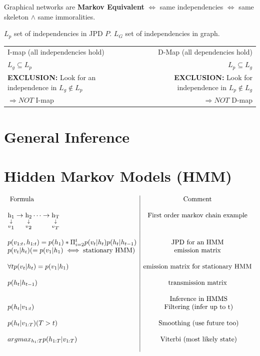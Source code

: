 \documentclass[a4paper,10pt]{article}
\newcommand{\ra}{\rightarrow}
\newcommand{\alow}[2]{\operatorname*{#1}\limits_{\operatorname*{\downarrow}\limits_{\scaleto{#2}{5pt}}}}
\begin{document}
Graphical networks are \textbf{Markov Equivalent} $\iff$ same independencies $\iff$ same skeleton $\wedge$ same immoralities.

$L_p$ set of independencies in JPD $P$.
$L_G$ set of independencies in graph.

\begin{tabular}{l||r}
 I-map (all independencies hold)  & D-Map (all dependencies hold) \\
 $L_g \subseteq L_p$ &  $L_p \subseteq L_g$ \\
 \textbf{EXCLUSION:} Look for an independence in $L_g \notin L_p$ & \textbf{EXCLUSION:} Look for independence in $L_p \notin L_g$ \\
 $\Rightarrow NOT$ I-map & $\Rightarrow NOT$ D-map \\
\end{tabular}

\section{General Inference}

\section{Hidden Markov Models (HMM)}
$$\begin{array}{l|c}
    \textrm{ Formula} & \textrm{Comment}  \\ 
    \\
    \alow{h_1}{v_1} \ra \alow{h_2}{v_2} \cdots \ra \alow{h_T}{v_T} & \textrm{First order markov chain example} \\
    \\
    p(v_{1:t}, h_{1:t}) = p(h_1) * \Pi^{t}_{i=2} p(v_t|h_t) p(h_t| h_{t-1}) & \textrm{JPD for an HMM}
    \\
    p(v_t | h_t) (= p(v_1 | h_1) \iff \textrm{stationary HMM})   & \textrm{emission matrix} \\
    \\
    \forall t p(v_t | h_t) = p(v_1 | h_1)    & \textrm{emission matrix for stationary HMM} \\
    \\
    p(h_t | h_{t-1})  & \textrm{transmission matrix}  \\
    \\
     & \textrm{ Inference in HMMS} \\
    p(h_t | v_{1:t}) & \textrm{ Filtering (infer up to t)} \\
    \\
    p(h_t | v_{1:T}) (T > t) & \textrm{ Smoothing (use future too)} \\
    \\
    argmax_{h_1:T} p(h_{1:T} | v_{1:T}) & \textrm{ Viterbi (most likely state)} \\
    \\
  \end{array}
$$
\end{document}
